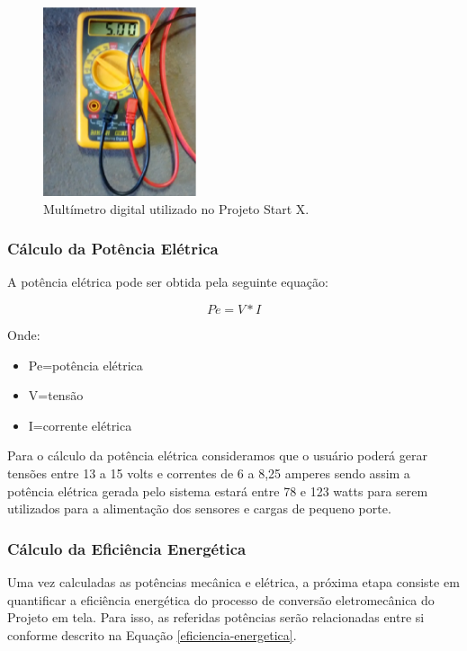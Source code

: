 \begin{figure}
  \centering
  \includegraphics[width=0.4\textwidth]{figuras/image3}
  \caption{Multímetro digital utilizado no Projeto Start X.}
  \label{multimetro}
\end{figure}

\subsubsection{Cálculo da Potência Elétrica}

A potência elétrica pode ser obtida pela seguinte equação:

\begin{equation}
  Pe=V\ast I
  \label{potencia-eletrica}
\end{equation}

Onde:

\begin{itemize}
  \item Pe=potência elétrica
  \item V=tensão 
  \item I=corrente elétrica
\end{itemize}

Para o cálculo da potência elétrica consideramos que o usuário poderá gerar tensões entre 13 a 15 volts e correntes de 6 a 8,25 amperes sendo assim a potência elétrica gerada pelo sistema estará entre 78 e 123 watts para serem utilizados para a alimentação dos sensores e cargas de pequeno porte.

\subsubsection{Cálculo da Eficiência Energética}
\label{calculo-eficiencias-energeticas}

Uma vez calculadas as potências mecânica e elétrica, a próxima etapa consiste em quantificar a eficiência energética do processo de conversão eletromecânica do Projeto em tela. Para isso, as referidas potências serão relacionadas entre si conforme descrito na Equação \ref{eficiencia-energetica}.

